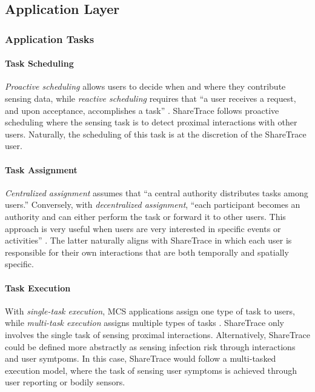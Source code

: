 \subsection{Application Layer}

\subsubsection{Application Tasks}

\paragraph{Task Scheduling}

\emph{Proactive scheduling} allows users to decide when and where they contribute sensing data, while \emph{reactive scheduling} requires that ``a user receives a request, and upon acceptance, accomplishes a task'' \cite{Capponi2019}. ShareTrace follows proactive scheduling where the sensing task is to detect proximal interactions with other users. Naturally, the scheduling of this task is at the discretion of the ShareTrace user.

\paragraph{Task Assignment}

\emph{Centralized assignment} assumes that ``a central authority distributes tasks among users.'' Conversely, with \emph{decentralized assignment}, ``each participant becomes an authority and can either perform the task or forward it to other users. This approach is very useful when users are very interested in specific events or activities'' \cite{Capponi2019}. The latter naturally aligns with ShareTrace in which each user is responsible for their own interactions that are both temporally and spatially specific.

\paragraph{Task Execution}

With \emph{single-task execution}, MCS applications assign one type of task to users, while \emph{multi-task execution} assigns  multiple types of tasks \cite{Capponi2019}. ShareTrace only involves the single task of sensing proximal interactions. Alternatively, ShareTrace could be defined more abstractly as sensing infection risk through interactions and user symtpoms. In this case, ShareTrace would follow a multi-tasked execution model, where the task of sensing user symptoms is achieved through user reporting or bodily sensors.

